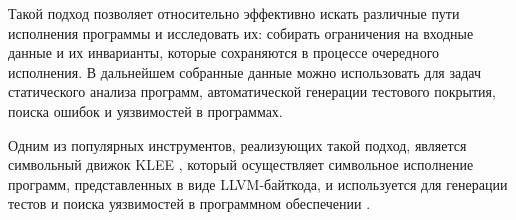 Такой подход позволяет относительно эффективно искать различные пути исполнения программы и исследовать их: собирать ограничения на входные данные и их инварианты, которые сохраняются в процессе очередного исполнения. В дальнейшем собранные данные можно использовать для задач статического анализа программ, автоматической генерации тестового покрытия, поиска ошибок и уязвимостей в программах.

Одним из популярных инструментов, реализующих такой подход, является символьный движок KLEE \cite{klee-website}, который осуществляет символьное исполнение программ, представленных в виде LLVM-байткода, и используется для генерации тестов и поиска уязвимостей в программном обеспечении \cite{klee-paper}.

